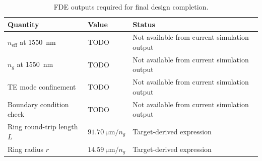 \begin{table}[H]
\centering
\caption{FDE outputs required for final design completion.}
\label{tab:fde-results}
\begin{tabular}{lll}
\toprule
Quantity & Value & Status \\
\midrule
\(n_{\mathrm{eff}}\) at \SI{1550}{\nano\metre} & TODO & Not available from current simulation output \\
\(n_g\) at \SI{1550}{\nano\metre} & TODO & Not available from current simulation output \\
TE mode confinement & TODO & Not available from current simulation output \\
Boundary condition check & TODO & Not available from current simulation output \\
Ring round-trip length \(L\) & \(\SI{91.70}{\micro\metre}/n_g\) & Target-derived expression \\
Ring radius \(r\) & \(\SI{14.59}{\micro\metre}/n_g\) & Target-derived expression \\
\bottomrule
\end{tabular}
\end{table}
